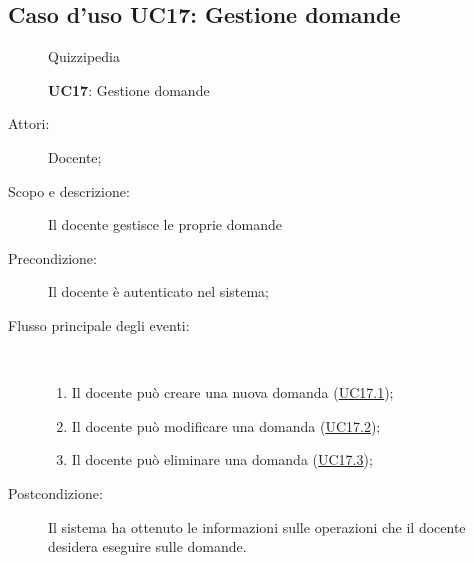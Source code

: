 \subsection{Caso d'uso UC17: Gestione domande}
\begin{figure}[H]
	\centering
	\begin{resizedtikzpicture}{\textwidth}
		\begin{umlsystem}[x=0, fill=lightgray!20]{Quizzipedia}
		\end{umlsystem}
	\end{resizedtikzpicture}
	\caption{\textbf{UC17}: Gestione domande}
	\label{UC17}
\end{figure}
\begin{description}
	\item[Attori:] Docente;
	\item[Scopo e descrizione:] Il docente gestisce le proprie domande
	\item[Precondizione:] Il docente è autenticato nel sistema;
	
	\item[Flusso principale degli eventi:] \ 
	\begin{enumerate}
		\item Il docente può creare una nuova domanda (\hyperlink{UC17.1}{UC17.1});
		\item Il docente può modificare una domanda (\hyperlink{UC17.2}{UC17.2});
		\item Il docente può eliminare una domanda (\hyperlink{UC17.3}{UC17.3});
		
	\end{enumerate}
	\item[Postcondizione:] Il sistema ha ottenuto le informazioni sulle operazioni che il docente desidera eseguire sulle domande.
\end{description}
\hypertarget{UC17.1}{}

